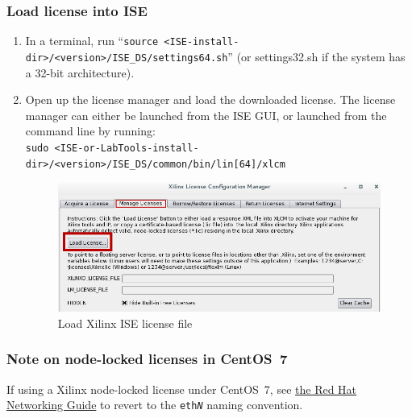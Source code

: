 \subsubsection{Load license into ISE}
\begin{enumerate}
\item In a terminal, run ``\verb+source <ISE-install-dir>/<version>/ISE_DS/settings64.sh+'' (or settings32.sh if the system has a 32-bit architecture).
\item Open up the license manager and load the downloaded license. The license manager can either be launched from the ISE GUI, or launched from the command line by running: \\\verb+sudo <ISE-or-LabTools-install-dir>/<version>/ISE_DS/common/bin/lin[64]/xlcm+

\begin{figure}[H]
	\centerline{\includegraphics[scale=0.5]{./figures/xilinx_license_load.jpg}}
	\caption{Load Xilinx ISE license file}
\end{figure}
\end{enumerate}

\subsubsection{Note on node-locked licenses in CentOS~7}
If using a Xilinx node-locked license under CentOS~7, see \href{https://access.redhat.com/documentation/en-US/Red_Hat_Enterprise_Linux/7/html/Networking_Guide/sec-Disabling_Consistent_Network_Device_Naming.html}{the Red Hat Networking Guide} to revert to the
\texttt{eth\textit{N}} naming convention.

